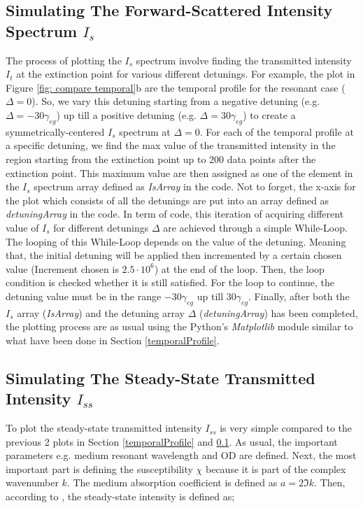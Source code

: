 \subsection{Simulating The Forward-Scattered Intensity Spectrum $I_{s}$}\label{forwardScattered}
The process of plotting the $I_{s}$ spectrum involve finding the transmitted intensity $I_{t}$ at the extinction point for various different detunings. For example, the plot in Figure \ref{fig: compare temporal}b are the temporal profile for the resonant case ($\Delta = 0$). So, we vary this detuning starting from a negative detuning (e.g. $\Delta = -30\gamma_{eg}$) up  till a positive detuning (e.g. $\Delta = 30\gamma_{eg}$) to create a symmetrically-centered $I_{s}$ spectrum at $\Delta = 0$. For each of the temporal profile at a specific detuning, we find the max value of the transmitted intensity in the region starting from the extinction point up to 200 data points after the extinction point. This maximum value are then assigned as one of the element in the $I_{s}$ spectrum array defined as \textit{IsArray} in the code. Not to forget, the x-axis for the plot which consists of all the detunings are put into an array defined as \textit{detuningArray} in the code. In term of code, this iteration of acquiring different value of $I_{s}$ for different detunings $\Delta$ are achieved through a simple While-Loop. The looping of this While-Loop depends on the value of the detuning. Meaning that, the initial detuning will be applied then incremented by a certain chosen value (Increment chosen is $2.5 \cdot 10^{6}$) at the end of the loop. Then, the loop condition is checked whether it is still satisfied. For the loop to continue, the detuning value must be in the range $-30\gamma_{eg}$ up till $30\gamma_{eg}$. Finally, after both the $I_{s}$ array (\textit{IsArray}) and the detuning array $\Delta$ (\textit{detuningArray}) has been completed, the plotting process are as usual using the Python's \textit{Matplotlib} module similar to what have been done in Section \ref{temporalProfile}. 

\subsection{Simulating The Steady-State Transmitted Intensity $I_{ss}$}\label{steady}
To plot the steady-state transmitted intensity $I_{ss}$ is very simple compared to the previous 2 plots in Section \ref{temporalProfile} and \ref{forwardScattered}. As usual, the important parameters e.g. medium resonant wavelength and OD are defined. Next, the most important part is defining the susceptibility $\chi$ because it is part of the complex wavenumber $k$. The medium absorption coefficient is defined as $a = 2\Im{k}$. Then, according to , the steady-state intensity is defined as;

